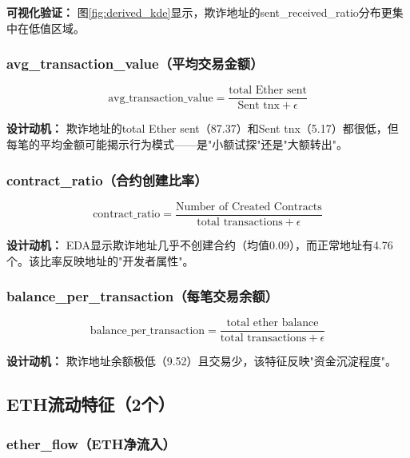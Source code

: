 \documentclass[12pt,a4paper]{article}
\begin{document}
\textbf{可视化验证：} 图\ref{fig:derived_kde}显示，欺诈地址的sent\_received\_ratio分布更集中在低值区域。

\subsubsection{avg\_transaction\_value（平均交易金额）}

\begin{equation}
\text{avg\_transaction\_value} = \frac{\text{total Ether sent}}{\text{Sent tnx} + \epsilon}
\end{equation}

\textbf{设计动机：} 欺诈地址的total Ether sent（87.37）和Sent tnx（5.17）都很低，但每笔的平均金额可能揭示行为模式——是"小额试探"还是"大额转出"。

\subsubsection{contract\_ratio（合约创建比率）}

\begin{equation}
\text{contract\_ratio} = \frac{\text{Number of Created Contracts}}{\text{total transactions} + \epsilon}
\end{equation}

\textbf{设计动机：} EDA显示欺诈地址几乎不创建合约（均值0.09），而正常地址有4.76个。该比率反映地址的"开发者属性"。

\subsubsection{balance\_per\_transaction（每笔交易余额）}

\begin{equation}
\text{balance\_per\_transaction} = \frac{\text{total ether balance}}{\text{total transactions} + \epsilon}
\end{equation}

\textbf{设计动机：} 欺诈地址余额极低（9.52）且交易少，该特征反映"资金沉淀程度"。

\subsection{ETH流动特征（2个）}

\subsubsection{ether\_flow（ETH净流入）}
\end{document}
